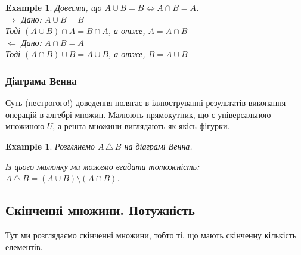 \documentclass[a4paper, 14pt]{extarticle}
\def\rightproof{$\boxed{\Rightarrow}$ }
\def\leftproof{$\boxed{\Leftarrow}$ }
\theoremstyle{theoremdd}
\theoremstyle{theoremdd}
\theoremstyle{theoremdd}
\theoremstyle{theoremdd}
\theoremstyle{theoremdd}
\newtheorem{example}[theorem]{Example}
\theoremstyle{theoremdd}
\theoremstyle{theoremdd}
\theoremstyle{theoremdd}
\theoremstyle{theoremdd}
\theoremstyle{theoremdd}
\theoremstyle{theoremdd}
\theoremstyle{theoremdd}
\theoremstyle{theoremdd}
\theoremstyle{theoremdd}
\theoremstyle{theoremdd}
\newcommand{\symdif}{\,\triangle\,} %
\begin{document}
\begin{example}
Довести, що $A \cup B = B \iff A \cap B = A$.\\
\rightproof Дано: $A \cup B = B$\\
Тоді $(A \cup B) \cap A = B \cap A$, а отже, $A = A \cap B$
\bigskip \\
\leftproof Дано: $A \cap B = A$\\
Тоді $(A \cap B) \cup B = A \cup B$, а отже, $B = A \cup B$
\end{example}

\subsubsection{Діаграма Венна}
Суть (нестрогого!) доведення полягає в іллюструванні результатів виконання операцій в алгебрі множин. Малюють прямокутник, що є універсальною множиною $U$, а решта множини виглядають як якісь фігурки.
\begin{example}
Розглянемо $A \symdif B$ на діаграмі Венна.

\begin{figure}[H]
\centering
{}
\qquad
{}
\end{figure}
Із цього малюнку ми можемо вгадати тотожність: \\ $A \symdif B = (A \cup B) \setminus (A \cap B)$.
\end{example}

\subsection{Скінченні множини. Потужність}
Тут ми розглядаємо скінченні множини, тобто ті, що мають скінченну кількість елементів.
\end{document}

